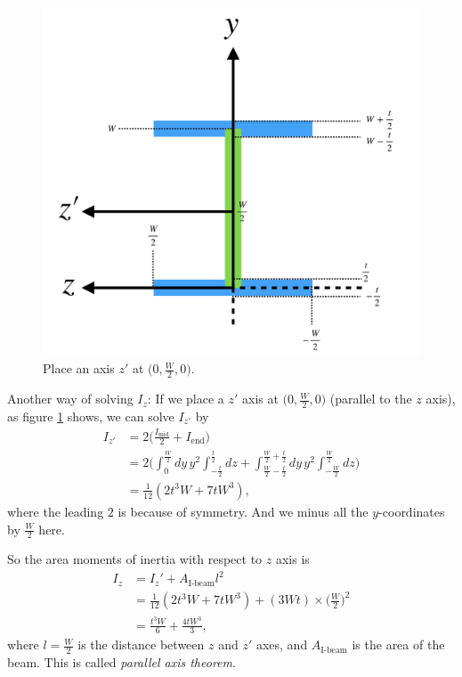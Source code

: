 \documentclass[12pt]{article}
\begin{document}
\begin{figure}[h]
	\centering
	\includegraphics[width=0.7\linewidth]{images/I-beam-2}
	\caption{Place an axis $z'$ at $\big(0, \frac{ W }{ 2 }, 0 \big)$.}
	\label{fig:i-beam-2}
\end{figure}
Another way of solving $I_z$:
If we place a $z'$ axis at $\big(0, \frac{ W }{ 2 }, 0 \big)$ (parallel to the $z$ axis), as figure \ref{fig:i-beam-2} shows,
we can solve $I_{z'}$ by
\begin{equation}
	\begin{split}
		I_{z'} &= 2 \bigg(\frac{I_\text{mid}}{2} + I_\text{end} \bigg) \\
		&= 2 \bigg(
		\int_{0}^{\frac{ W }{ 2 }} dy \, y^2 \int_{-\frac{ t }{ 2 }}^{\frac{ t }{ 2 }} dz
		+ \int_{\frac{ W }{ 2 } - \frac{ t }{ 2 }}^{\frac{ W }{ 2 } + \frac{ t }{ 2 }} dy \, y^2 \int_{-\frac{ W }{ 2 }}^{\frac{ W }{ 2 }} dz
		\bigg) \\
		&= \frac{1}{12} (2 t^3 W+7 t W^3),
	\end{split}
\end{equation}
where the leading $2$ is because of symmetry. And we minus all the $y$-coordinates by $\frac{ W }{ 2 }$ here.

So the area moments of inertia with respect to $z$ axis is
\begin{equation}
	\begin{split}
		I_z &= I_z' + A_\text{I-beam} l^2 \\
		&= \frac{1}{12} (2 t^3 W+7 t W^3) + (3 W t) \times \bigg( \frac{ W }{ 2 } \bigg)^2 \\
		&= \frac{t^3 W}{6} + \frac{4 t W^3}{3},
	\end{split}
\end{equation}
where $l = \frac{ W }{ 2 }$ is the distance between $z$ and $z'$ axes, and $A_\text{I-beam}$ is the area of the beam.
This is called \emph{parallel axis theorem}.
\end{document}
